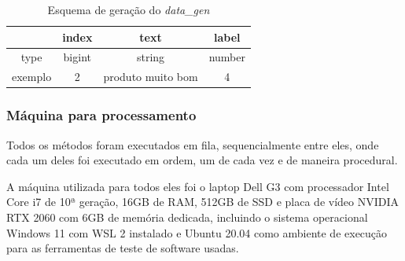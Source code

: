 \begin{table}[H]
    \centering
    \begin{tabular}{cccc}
                & index  & text              & label  \\\hline\hline
        type    & bigint & string            & number \\\hline
        exemplo & 2      & produto muito bom & 4
    \end{tabular}
    \caption{Esquema de geração do \textit{data\_gen}}
    \label{tab:gen}
\end{table}


\subsubsection{Máquina para processamento}

Todos os métodos foram executados em fila, sequencialmente entre eles, onde cada um deles foi executado em ordem, um de cada vez e de maneira procedural.

A máquina utilizada para todos eles foi o laptop Dell G3 com processador Intel Core i7 de 10ª geração, 16GB de RAM, 512GB de SSD e placa de vídeo NVIDIA RTX 2060 com 6GB de memória dedicada, incluindo o sistema operacional Windows 11 com WSL 2 instalado e Ubuntu 20.04 como ambiente de execução para as ferramentas de teste de software usadas.









